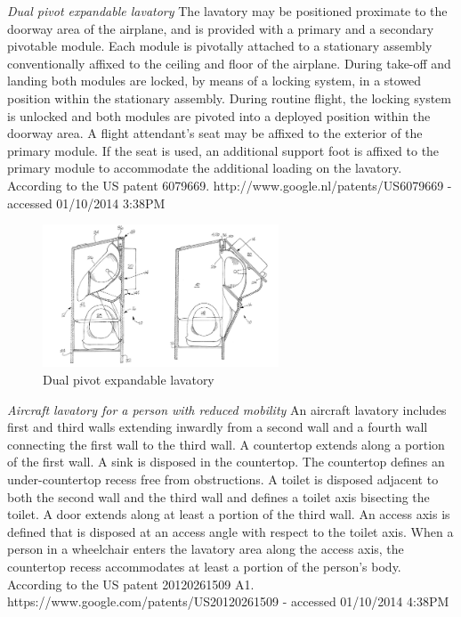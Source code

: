 \emph{Dual pivot expandable lavatory} The lavatory may be positioned proximate to the doorway area of the airplane, and is provided with a primary and a secondary pivotable module. Each module is pivotally attached to a stationary assembly conventionally affixed to the ceiling and floor of the airplane. During take-off and landing both modules are locked, by means of a locking system, in a stowed position within the stationary assembly. During routine flight, the locking system is unlocked and both modules are pivoted into a deployed position within the doorway area. A flight attendant's seat may be affixed to the exterior of the primary module. If the seat is used, an additional support foot is affixed to the primary module to accommodate the additional loading on the lavatory. According to the US patent 6079669. 
http://www.google.nl/patents/US6079669 - accessed 01/10/2014 3:38PM

\begin{figure}[h]
\centering
\includegraphics[width=7cm]{brazil_images/image016.png}
\caption{Dual pivot expandable lavatory}
\label{fig:expandable_lavatory}
\end{figure}

\emph{Aircraft lavatory for a person with reduced mobility} An aircraft lavatory includes first and third walls extending inwardly from a second wall and a fourth wall connecting the first wall to the third wall. A countertop extends along a portion of the first wall. A sink is disposed in the countertop. The countertop defines an under-countertop recess free from obstructions. A toilet is disposed adjacent to both the second wall and the third wall and defines a toilet axis bisecting the toilet. A door extends along at least a portion of the third wall. An access axis is defined that is disposed at an access angle with respect to the toilet axis. When a person in a wheelchair enters the lavatory area along the access axis, the countertop recess accommodates at least a portion of the person's body. According to the US patent 20120261509 A1. 
https://www.google.com/patents/US20120261509 - accessed 01/10/2014 4:38PM

